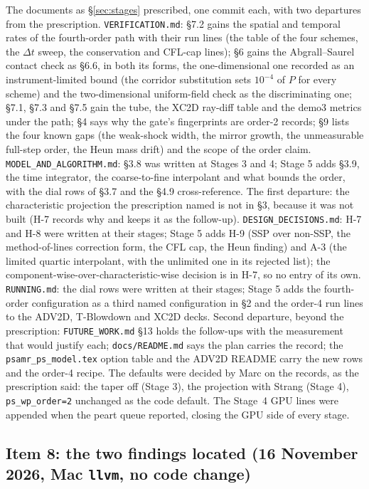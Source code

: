 \documentclass[11pt,a4paper]{article}
\newcommand{\code}[1]{\texttt{\small #1}}
\begin{document}
The documents as \S\ref{sec:stages} prescribed, one commit each, with
two departures from the prescription.  \code{VERIFICATION.md}: \S7.2
gains the spatial and temporal rates of the fourth-order path with their
run lines (the table of the four schemes, the $\Delta t$ sweep, the
conservation and CFL-cap lines); \S6 gains the Abgrall--Saurel contact
check as \S6.6, in both its forms, the one-dimensional one recorded as
an instrument-limited bound (the corridor substitution sets $10^{-4}$ of
$P$ for every scheme) and the two-dimensional uniform-field check as the
discriminating one; \S7.1, \S7.3 and \S7.5 gain the tube, the XC2D
ray-diff table and the demo3 metrics under the path; \S4 says why the
gate's fingerprints are order-2 records; \S9 lists the four known gaps
(the weak-shock width, the mirror growth, the unmeasurable full-step
order, the Heun mass drift) and the scope of the order claim.
\code{MODEL\_AND\_ALGORITHM.md}: \S3.8 was written at Stages 3 and 4;
Stage 5 adds \S3.9, the time integrator, the coarse-to-fine interpolant
and what bounds the order, with the dial rows of \S3.7 and the \S4.9
cross-reference.  The first departure: the characteristic projection the
prescription named is not in \S3, because it was not built (H-7 records
why and keeps it as the follow-up).  \code{DESIGN\_DECISIONS.md}: H-7
and H-8 were written at their stages; Stage 5 adds H-9 (SSP over
non-SSP, the method-of-lines correction form, the CFL cap, the Heun
finding) and A-3 (the limited quartic interpolant, with the unlimited
one in its rejected list); the component-wise-over-characteristic-wise
decision is in H-7, so no entry of its own.  \code{RUNNING.md}: the dial
rows were written at their stages; Stage 5 adds the fourth-order
configuration as a third named configuration in \S2 and the order-4
run lines to the ADV2D, T-Blowdown and XC2D decks.  Second departure,
beyond the prescription: \code{FUTURE\_WORK.md} \S13 holds the
follow-ups with the measurement that would justify each;
\code{docs/README.md} says the plan carries the record; the
\code{psamr\_ps\_model.tex} option table and the ADV2D README carry
the new rows and the order-4 recipe.  The defaults were decided by Marc
on the records, as the prescription said: the taper off (Stage 3), the
projection with Strang (Stage 4), \code{ps\_wp\_order=2} unchanged as
the code default.  The Stage~4 GPU lines were
appended when the peart queue reported, closing the GPU side of every
stage.

\subsection{Item 8: the two findings located (16 November 2026, Mac \code{llvm}, no code change)}
\label{sec:fu8}
\end{document}
